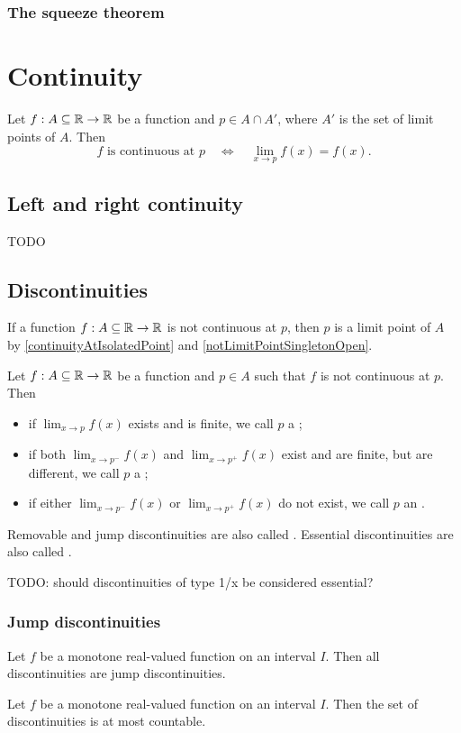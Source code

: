 \subsubsection{The squeeze theorem}


\section{Continuity}
\begin{proposition}
Let $f:A\subseteq\mathbb{R}\to\mathbb{R}$ be a function and $p\in A\cap A'$, where $A'$ is the set of limit points of $A$. Then
\[ \text{$f$ is continuous at $p$} \quad\iff\quad \lim_{x\to p}f(x) = f(x). \]
\end{proposition}

\subsection{Left and right continuity}
TODO

\subsection{Discontinuities}
If a function $f:A\subseteq\mathbb{R}\to\mathbb{R}$ is not continuous at $p$, then $p$ is a limit point of $A$ by \ref{continuityAtIsolatedPoint} and \ref{notLimitPointSingletonOpen}.
\begin{definition}
Let $f:A\subseteq\mathbb{R}\to\mathbb{R}$ be a function and $p\in A$ such that $f$ is not continuous at $p$. Then
\begin{itemize}
\item if $\lim_{x\to p}f(x)$ exists and is finite, we call $p$ a ;
\item if both $\lim_{x\to p^-}f(x)$ and $\lim_{x\to p^+}f(x)$ exist and are finite, but are different, we call $p$ a ;
\item if either $\lim_{x\to p^-}f(x)$ or $\lim_{x\to p^+}f(x)$ do not exist, we call $p$ an .
\end{itemize}
Removable and jump discontinuities are also called . Essential discontinuities are also called .
\end{definition}
TODO: should discontinuities of type 1/x be considered essential?

\subsubsection{Jump discontinuities}
\begin{proposition} \label{monotoneDiscontinuities}
Let $f$ be a monotone real-valued function on an interval $I$. Then all discontinuities are jump discontinuities.
\end{proposition}
\begin{theorem} \label{DarbouxFroda}
Let $f$ be a monotone real-valued function on an interval $I$. Then the set of discontinuities is at most countable.
\end{theorem}

